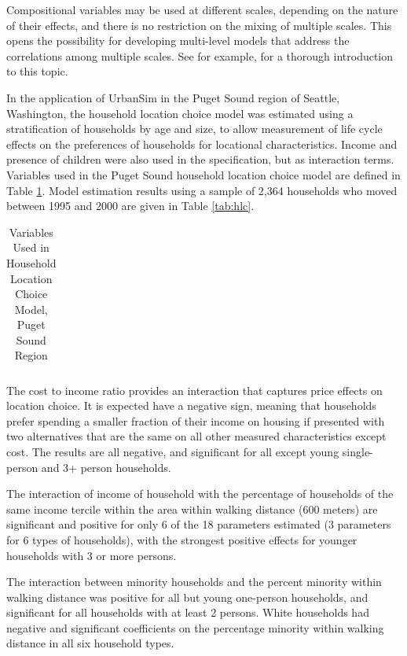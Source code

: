 \documentclass[12pt,a4paper]{article}
\begin{document}
Compositional variables may be used at different scales, depending
on the nature of their effects, and there is no restriction on the
mixing of multiple scales.  This opens the possibility for
developing multi-level models that address the correlations among
multiple scales.  See for example, \cite{goldstein-book-1995} for
a thorough introduction to this topic.

In the application of UrbanSim in the Puget Sound region of
Seattle, Washington, the household location choice model was
estimated using a stratification of households by age and size, to
allow measurement of life cycle effects on the preferences of
households for locational characteristics.  Income and presence of
children were also used in the specification, but as interaction
terms.  Variables used in the Puget Sound household location
choice model are defined in Table \ref{tab:vardef}.  Model
estimation results using a sample of 2,364 households who moved
between 1995 and 2000 are given in Table \ref{tab:hlc}.

\begin{table}[h]
\caption{Variables Used in Household Location Choice Model, Puget
Sound Region} \label{tab:vardef}
\centering
\begin{tabular}{ll}
\hline\hline

\hline
\end{tabular}
\end{table}

The cost to income ratio provides an interaction that captures
price effects on location choice.  It is expected have a negative
sign, meaning that households prefer spending a smaller fraction
of their income on housing if presented with two alternatives that
are the same on all other measured characteristics except cost.
The results are all negative, and significant for all except young
single-person and 3+ person households.

The interaction of income of household with the percentage of
households of the same income tercile within the area within
walking distance (600 meters) are significant and positive for
only 6 of the 18 parameters estimated (3 parameters for 6 types of
households), with the strongest positive effects for younger
households with 3 or more persons.

The interaction between minority households and the percent
minority within walking distance was positive for all but young
one-person households, and significant for all households with at
least 2 persons.  White households had negative and significant
coefficients on the percentage minority within walking distance in
all six household types.
\end{document}
